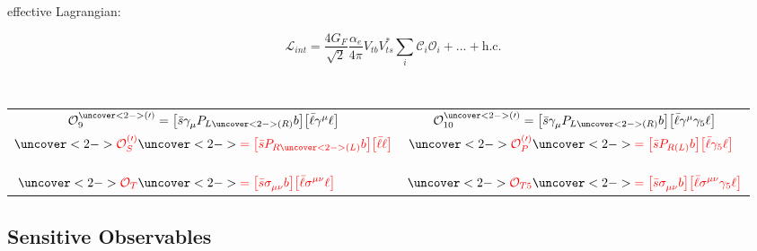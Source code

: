 \documentclass[english]{beamer}
\newcommand{\slide}[2][t]{\begin{frame}[#1] \frametitle{\insertsubsectionhead} #2 \end{frame}}
\begin{document}
\slide{

    effective Lagrangian: \
    \
    \newline \newline \

    $$ \mathcal{L}_{int} = \frac{4 G_F}{\sqrt{2}} \frac{\alpha_e}{4\pi} V_{tb}^{} V_{ts}^\ast \sum_i \mathcal{C}_i \mathcal{O}_i + ... + \text{h.c.} $$

    ~ \newline

    \begin{center}
      \begin{tabular}{cc}
          \small $ \mathcal{O}_{9} ^{\uncover<2->{(\prime)}} = \left[\bar{s} \gamma_\mu^{} P_{L\uncover<2->{(R)}} b\right]\!\left[\bar{\ell} \gamma^\mu \ell\right] $
                & \small $  \mathcal{O}_{10}^{\uncover<2->{(\prime)}} = \left[\bar{s} \gamma_\mu^{} P_{L\uncover<2->{(R)}} b\right]\!\left[\bar{\ell} \gamma^\mu \gamma_5 \ell\right] $ \\[1cm]
          \Large $ \begin{aligned}
                \redsecond{\mathcal{O}_S^{(\prime)}}    & \redsecond{= \left[\bar{s} P_{R\redsecond{(L)}} b\right]\!\left[\bar{\ell} \ell\right]} \\[5mm]
                \redsecond{\mathcal{O}_T}               & \redsecond{= \left[\bar{s} \sigma_{\mu\nu}^{} b\right]\!\left[\bar{\ell} \sigma^{\mu\nu} \ell\right] }
          \end{aligned} $ & \Large $ \begin{aligned}
                \redsecond{\mathcal{O}_P^{(\prime)}}    & \redsecond{= \left[\bar{s} P_{R(L)} b\right]\!\left[\bar{\ell} \gamma_5 \ell\right] } \\[5mm]
                \redsecond{\mathcal{O}_{T5}}            & \redsecond{= \left[\bar{s} \sigma_{\mu\nu}^{} b\right]\!\left[\bar{\ell} \sigma^{\mu\nu} \gamma_5 \ell\right] }
          \end{aligned} $
     \end{tabular}
    \end{center}

}

\subsection{Sensitive Observables}

\slide{


}
\end{document}
